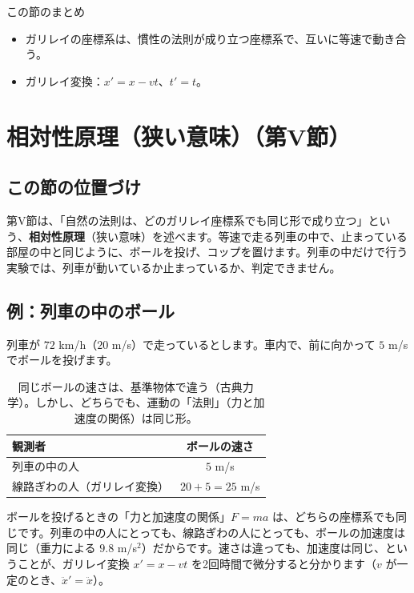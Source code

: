 \documentclass[a4paper,11pt,openany]{ltjsbook}
\begin{document}
\begin{pointbox}{この節のまとめ}
\begin{itemize}[leftmargin=*]
\item ガリレイの座標系は、慣性の法則が成り立つ座標系で、互いに等速で動き合う。
\item ガリレイ変換：$x'=x-vt$、$t'=t$。
\end{itemize}
\end{pointbox}

\chapter{相対性原理（狭い意味）（第V節）}

\section{この節の位置づけ}

第V節は、「自然の法則は、どのガリレイ座標系でも同じ形で成り立つ」という、\textbf{相対性原理}（狭い意味）を述べます。等速で走る列車の中で、止まっている部屋の中と同じように、ボールを投げ、コップを置けます。列車の中だけで行う実験では、列車が動いているか止まっているか、判定できません。

\section{例：列車の中のボール}

列車が $72$ km/h（$20$ m/s）で走っているとします。車内で、前に向かって $5$ m/s でボールを投げます。

\begin{table}[htbp]
\centering
\begin{tabular}{lc}
\toprule
観測者 & ボールの速さ\\
\midrule
列車の中の人 & $5$ m/s\\
線路ぎわの人（ガリレイ変換） & $20+5=25$ m/s\\
\bottomrule
\end{tabular}
\caption{同じボールの速さは、基準物体で違う（古典力学）。しかし、どちらでも、運動の「法則」（力と加速度の関係）は同じ形。}
\end{table}

ボールを投げるときの「力と加速度の関係」$F=ma$ は、どちらの座標系でも同じです。列車の中の人にとっても、線路ぎわの人にとっても、ボールの加速度は同じ（重力による $9.8$ m/s$^2$）だからです。速さは違っても、加速度は同じ、ということが、ガリレイ変換 $x'=x-vt$ を2回時間で微分すると分かります（$v$ が一定のとき、$\ddot{x}'=\ddot x$）。
\end{document}
